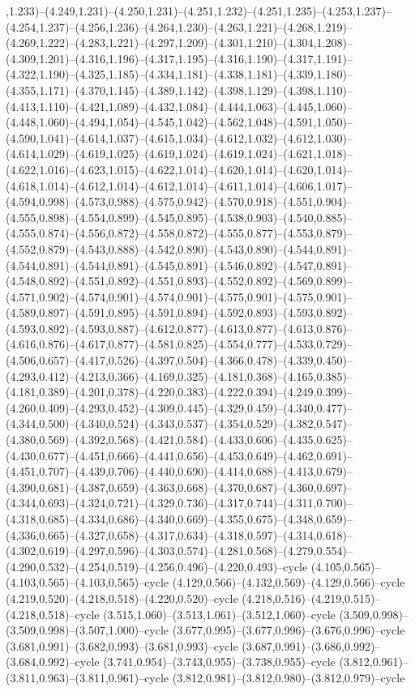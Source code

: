 ,1.233)--(4.249,1.231)--(4.250,1.231)--(4.251,1.232)--(4.251,1.235)--(4.253,1.237)--(4.254,1.237)--(4.256,1.236)--(4.264,1.230)--(4.263,1.221)--(4.268,1.219)--(4.269,1.222)--(4.283,1.221)--(4.297,1.209)--(4.301,1.210)--(4.304,1.208)--(4.309,1.201)--(4.316,1.196)--(4.317,1.195)--(4.316,1.190)--(4.317,1.191)--(4.322,1.190)--(4.325,1.185)--(4.334,1.181)--(4.338,1.181)--(4.339,1.180)--(4.355,1.171)--(4.370,1.145)--(4.389,1.142)--(4.398,1.129)--(4.398,1.110)--(4.413,1.110)--(4.421,1.089)--(4.432,1.084)--(4.444,1.063)--(4.445,1.060)--(4.448,1.060)--(4.494,1.054)--(4.545,1.042)--(4.562,1.048)--(4.591,1.050)--(4.590,1.041)--(4.614,1.037)--(4.615,1.034)--(4.612,1.032)--(4.612,1.030)--(4.614,1.029)--(4.619,1.025)--(4.619,1.024)--(4.619,1.024)--(4.621,1.018)--(4.622,1.016)--(4.623,1.015)--(4.622,1.014)--(4.620,1.014)--(4.620,1.014)--(4.618,1.014)--(4.612,1.014)--(4.612,1.014)--(4.611,1.014)--(4.606,1.017)--(4.594,0.998)--(4.573,0.988)--(4.575,0.942)--(4.570,0.918)--(4.551,0.904)--(4.555,0.898)--(4.554,0.899)--(4.545,0.895)--(4.538,0.903)--(4.540,0.885)--(4.555,0.874)--(4.556,0.872)--(4.558,0.872)--(4.555,0.877)--(4.553,0.879)--(4.552,0.879)--(4.543,0.888)--(4.542,0.890)--(4.543,0.890)--(4.544,0.891)--(4.544,0.891)--(4.544,0.891)--(4.545,0.891)--(4.546,0.892)--(4.547,0.891)--(4.548,0.892)--(4.551,0.892)--(4.551,0.893)--(4.552,0.892)--(4.569,0.899)--(4.571,0.902)--(4.574,0.901)--(4.574,0.901)--(4.575,0.901)--(4.575,0.901)--(4.589,0.897)--(4.591,0.895)--(4.591,0.894)--(4.592,0.893)--(4.593,0.892)--(4.593,0.892)--(4.593,0.887)--(4.612,0.877)--(4.613,0.877)--(4.613,0.876)--(4.616,0.876)--(4.617,0.877)--(4.581,0.825)--(4.554,0.777)--(4.533,0.729)--(4.506,0.657)--(4.417,0.526)--(4.397,0.504)--(4.366,0.478)--(4.339,0.450)--(4.293,0.412)--(4.213,0.366)--(4.169,0.325)--(4.181,0.368)--(4.165,0.385)--(4.181,0.389)--(4.201,0.378)--(4.220,0.383)--(4.222,0.394)--(4.249,0.399)--(4.260,0.409)--(4.293,0.452)--(4.309,0.445)--(4.329,0.459)--(4.340,0.477)--(4.344,0.500)--(4.340,0.524)--(4.343,0.537)--(4.354,0.529)--(4.382,0.547)--(4.380,0.569)--(4.392,0.568)--(4.421,0.584)--(4.433,0.606)--(4.435,0.625)--(4.430,0.677)--(4.451,0.666)--(4.441,0.656)--(4.453,0.649)--(4.462,0.691)--(4.451,0.707)--(4.439,0.706)--(4.440,0.690)--(4.414,0.688)--(4.413,0.679)--(4.390,0.681)--(4.387,0.659)--(4.363,0.668)--(4.370,0.687)--(4.360,0.697)--(4.344,0.693)--(4.324,0.721)--(4.329,0.736)--(4.317,0.744)--(4.311,0.700)--(4.318,0.685)--(4.334,0.686)--(4.340,0.669)--(4.355,0.675)--(4.348,0.659)--(4.336,0.665)--(4.327,0.658)--(4.317,0.634)--(4.318,0.597)--(4.314,0.618)--(4.302,0.619)--(4.297,0.596)--(4.303,0.574)--(4.281,0.568)--(4.279,0.554)--(4.290,0.532)--(4.254,0.519)--(4.256,0.496)--(4.220,0.493)--cycle (4.105,0.565)--(4.103,0.565)--(4.103,0.565)--cycle (4.129,0.566)--(4.132,0.569)--(4.129,0.566)--cycle (4.219,0.520)--(4.218,0.518)--(4.220,0.520)--cycle (4.218,0.516)--(4.219,0.515)--(4.218,0.518)--cycle (3.515,1.060)--(3.513,1.061)--(3.512,1.060)--cycle (3.509,0.998)--(3.509,0.998)--(3.507,1.000)--cycle (3.677,0.995)--(3.677,0.996)--(3.676,0.996)--cycle (3.681,0.991)--(3.682,0.993)--(3.681,0.993)--cycle (3.687,0.991)--(3.686,0.992)--(3.684,0.992)--cycle (3.741,0.954)--(3.743,0.955)--(3.738,0.955)--cycle (3.812,0.961)--(3.811,0.963)--(3.811,0.961)--cycle (3.812,0.981)--(3.812,0.980)--(3.812,0.979)--cycle 